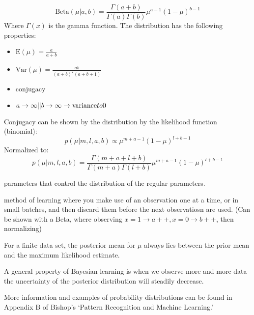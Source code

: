 \begin{defn}
	$$\text{Beta}(\mu |a,b)=\frac{\Gamma (a+b)}{\Gamma (a)\Gamma (b)}\mu^{a-1} (1-\mu )^{b-1}$$
	Where $\Gamma (x)$ is the gamma function.
	The distribution has the following properties:
	\begin{itemize}
		\item $\text{E}(\mu )=\frac{a}{a+b}$
		\item $\text{Var}(\mu )=\frac{ab}{(a+b)^2 (a+b+1)}$
		\item conjugacy
		\item ${a\to\infty || b\to\infty}\to \text{variance}\\to 0$ 
	\end{itemize}

	Conjugacy can be shown by the distribution by the likelihood function (binomial):
	$$p(\mu |m,l,a,b)\propto \mu^{m+a-1} (1-\mu )^{l+b-1}$$
	Normalized to:
	$$p(\mu |m,l,a,b)= \frac{\Gamma (m+a+l+b)}{\Gamma (m+a)\Gamma (l+b)} \mu^{m+a-1} (1-\mu )^{l+b-1}$$
\end{defn}

\begin{defn}[Hyperparameters] parameters that control the distribution of the regular parameters. \end{defn}

\begin{defn} method of learning where you make use of an observation one at a time, or in small batches, and then discard them before the next observatiosn are used. (Can be shown with a Beta, where observing $x=1\to a++, x=0\to b++$, then normalizing) \end{defn}

\begin{rem} For a finite data set, the posterior mean for $\mu$ always lies between the prior mean and the maximum likelihood estimate.\end{rem}

\begin{rem} A general property of Bayesian learning is when we observe more and more data the uncertainty of the posterior distribution will steadily decrease. \end{rem}

More information and examples of probability distributions can be found in Appendix B of Bishop's `Pattern Recognition and Machine Learning.'